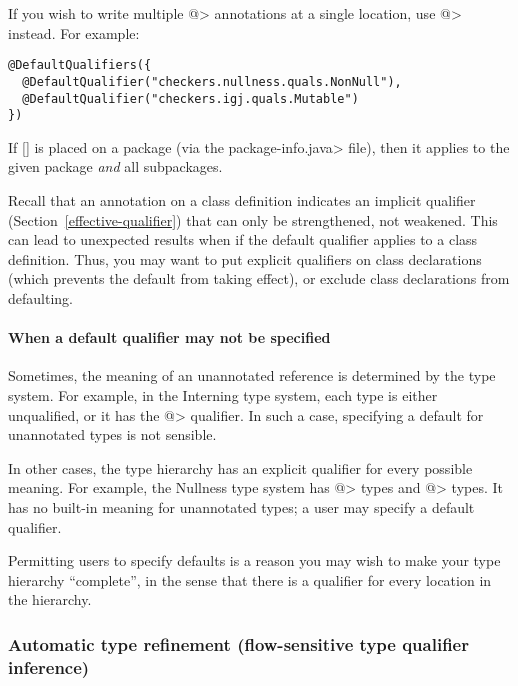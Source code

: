 If you wish to write multiple 
\<@> annotations at a single location,
use 
\<@> instead.  For example:

\begin{Verbatim}
@DefaultQualifiers({
  @DefaultQualifier("checkers.nullness.quals.NonNull"),
  @DefaultQualifier("checkers.igj.quals.Mutable")
})
\end{Verbatim}


If [] is placed on a package (via the
\<package-info.java> file), then it applies to the given package \emph{and}
all subpackages.

Recall that an annotation on a class definition indicates an implicit
qualifier (Section~\ref{effective-qualifier}) that can only be
strengthened, not weakened.  This can lead to unexpected results when if
the default qualifier applies to a class definition.  Thus, you may want to
put explicit qualifiers on class declarations (which prevents the default
from taking effect), or exclude class declarations from defaulting.


\paragraph{When a default qualifier may not be specified}

Sometimes, the meaning of an unannotated reference is determined by the
type system.  For example, in the Interning type system, each type is
either unqualified, or it has the \<@>
qualifier.  In such a case, specifying a default for unannotated types is
not sensible.

In other cases, the type hierarchy has an explicit qualifier for every
possible meaning.  For example, the Nullness type system has
\<@> types and
\<@> types.  It has no built-in meaning for
unannotated types; a user may specify a default qualifier.

Permitting users to specify defaults is a reason you may wish to make your
type hierarchy ``complete'', in the sense that there is a qualifier for
every location in the hierarchy.


\subsubsection{Automatic type refinement (flow-sensitive type qualifier inference)\label{type-refinement}}

